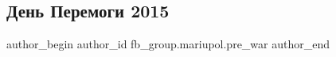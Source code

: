  
 
 
 
 

\subsection{День Перемоги 2015}
\label{sec:19_02_2023.fb.fb_group.mariupol.pre_war.3.den_peremogi_2015}

\ifcmt
 author_begin
   author_id fb_group.mariupol.pre_war
 author_end
\fi
